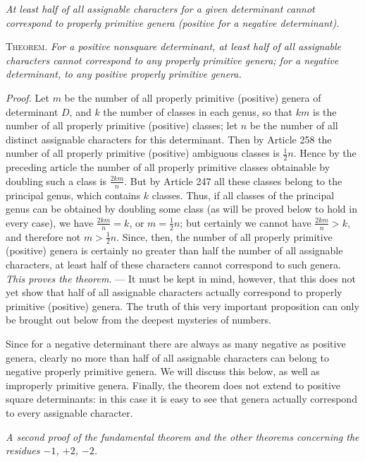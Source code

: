 \begin{center}
\textit{At least half of all assignable characters for a given determinant cannot correspond to properly primitive genera (positive for a negative determinant).}
\end{center}

\textsc{Theorem.} \textit{For a positive nonsquare determinant, at least half of all assignable characters cannot correspond to any properly primitive genera; for a negative determinant, to any positive properly primitive genera.}

\textit{Proof.} Let $m$ be the number of all properly primitive (positive) genera of determinant $D$, and $k$ the number of classes in each genus, so that $km$ is the number of all properly primitive (positive) classes; let $n$ be the number of all distinct assignable characters for this determinant. Then
by Article 258 the number of all properly primitive (positive) ambiguous classes is $\frac12 n$. Hence by the preceding article the number of all properly primitive classes obtainable by doubling such a class is $\frac{2km}{n}$. But by Article 247 all these classes belong to the principal genus, which contains $k$ classes. Thus, if all classes of the principal genus can be obtained by doubling some class (as will be proved below to hold in every case), we have $\frac{2km}{n}=k$, or $m=\frac12 n$; but certainly we cannot have $\frac{2km}{n}>k$, and therefore not $m>\frac12 n$. Since, then, the number of all properly primitive (positive) genera is certainly no greater than half the number of all assignable characters, at least half of these characters cannot correspond to such genera. \textit{This proves the theorem.} --- It must be kept in mind, however, that this does not yet show that half of all assignable characters actually correspond to properly primitive (positive) genera. The truth of this very important proposition can only be brought out below from the deepest mysteries of numbers.

Since for a negative determinant there are always as many negative as positive genera, clearly no more than half of all assignable characters can belong to negative properly primitive genera. We will discuss this below, as well as improperly primitive genera. Finally, the theorem does not extend to positive square determinants: in this case it is easy to see that genera actually correspond to every assignable character.

\begin{center}
\textit{A second proof of the fundamental theorem and the other theorems concerning the residues $-1$, $+2$, $-2$.}
\end{center}

